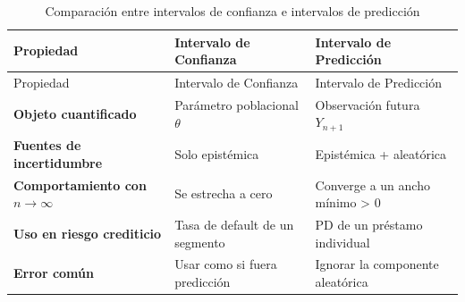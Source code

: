 \documentclass[
  spanish,
  11pt,
  letterpaper,
]{scrbook}
\theoremstyle{plain}
\theoremstyle{remark}
\begin{document}
\begin{longtable}[]{@{}
  >{\raggedright\arraybackslash}p{}
  >{\raggedright\arraybackslash}p{}
  >{\raggedright\arraybackslash}p{}@{}}
\caption{Comparación entre intervalos de confianza e intervalos de
predicción}\label{tbl-ci-vs-pi}\tabularnewline
\toprule\noalign{}
\begin{minipage}[b]{\linewidth}\raggedright
Propiedad
\end{minipage} & \begin{minipage}[b]{\linewidth}\raggedright
Intervalo de Confianza
\end{minipage} & \begin{minipage}[b]{\linewidth}\raggedright
Intervalo de Predicción
\end{minipage} \\
\midrule\noalign{}
\endfirsthead
\toprule\noalign{}
\begin{minipage}[b]{\linewidth}\raggedright
Propiedad
\end{minipage} & \begin{minipage}[b]{\linewidth}\raggedright
Intervalo de Confianza
\end{minipage} & \begin{minipage}[b]{\linewidth}\raggedright
Intervalo de Predicción
\end{minipage} \\
\midrule\noalign{}
\endhead
\bottomrule\noalign{}
\endlastfoot
\textbf{Objeto cuantificado} & Parámetro poblacional \(\theta\) &
Observación futura \(Y_{n+1}\) \\
\textbf{Fuentes de incertidumbre} & Solo epistémica & Epistémica +
aleatórica \\
\textbf{Comportamiento con \(n \to \infty\)} & Se estrecha a cero &
Converge a un ancho mínimo \textgreater{} 0 \\
\textbf{Uso en riesgo crediticio} & Tasa de default de un segmento & PD
de un préstamo individual \\
\textbf{Error común} & Usar como si fuera predicción & Ignorar la
componente aleatórica \\
\end{longtable}
\end{document}
